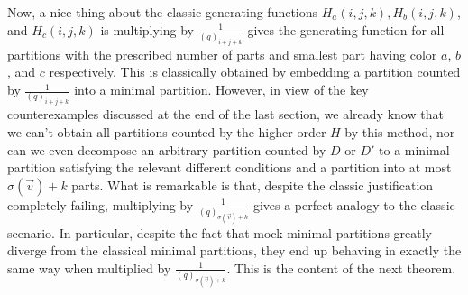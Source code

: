 \documentclass[12pt,a4paper]{amsart}
\theoremstyle{definition}
\theoremstyle{notation}
\theoremstyle{corollary}
\begin{document}
Now, a nice thing about the classic generating functions $H_a(i,j,k), H_b(i,j,k)$, and $H_c(i,j,k)$ is multiplying by $\frac{1}{(q)_{i+j+k}}$ gives the generating function for all partitions with the prescribed number of parts and smallest part having color $a$, $b$, and $c$ respectively. This is classically obtained by embedding a partition counted by $\frac{1}{(q)_{i+j+k}}$ into a minimal partition. However, in view of the key counterexamples discussed at the end of the last section, we already know that we can't obtain all partitions counted by the higher order $H$ by this method, nor can we even decompose an arbitrary partition counted by $D$ or $D'$ to a minimal partition satisfying the relevant different conditions and a partition into at most $\sigma(\vec{v})+k$ parts. What is remarkable is that, despite the classic justification completely failing, multiplying by $\frac{1}{(q)_{\sigma(\vec{v})+k}}$ gives a perfect analogy to the classic scenario. In particular, despite the fact that mock-minimal partitions greatly diverge from the classical minimal partitions, they end up behaving in exactly the same way when multiplied by $\frac{1}{(q)_{\sigma(\vec{v})+k}}$. This is the content of the next theorem.
\end{document}
